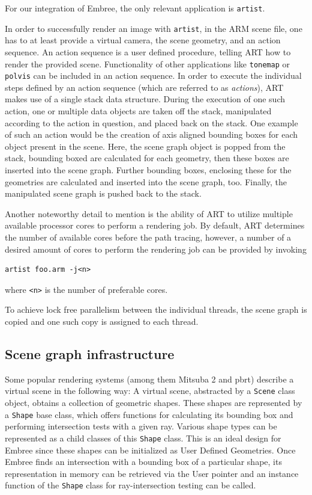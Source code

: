 For our integration of Embree, the only relevant application is \texttt{artist}. 

In order to successfully render an image with \texttt{artist}, in the ARM scene file, one has to at least provide a virtual camera, the scene geometry, and an action sequence. An action sequence is a user defined procedure, telling ART how to render the provided scene. Functionality of other applications like \texttt{tonemap} or \texttt{polvis} can be included in an action sequence.
In order to execute the individual steps  defined by an action sequence (which are referred to as \emph{actions}), ART makes use of a single stack data structure. During the execution of one such action, one or multiple data objects are taken off the stack, manipulated according to the action in question, and placed back on the stack. One example of such an action would be the creation of axis aligned bounding boxes for each object present in the scene. Here, the scene graph object is popped from the stack, bounding boxed are calculated for each geometry, then these boxes are inserted into the scene graph. Further bounding boxes, enclosing these for the geometries are calculated and inserted into the scene graph, too. Finally, the manipulated scene graph is pushed back to the stack.

Another noteworthy detail to mention is the ability of ART to utilize multiple available processor cores to perform a rendering job. By default, ART determines the number of available cores before the path tracing, however, a number of a desired amount of cores to perform the rendering job can be provided by invoking

\begin{Verbatim}
artist foo.arm -j<n>
\end{Verbatim}

where \texttt{<n>} is the number of preferable cores.

To achieve lock free parallelism between the individual threads, the scene graph is copied and one such copy is assigned to each thread. 
 

\subsection{Scene graph infrastructure}
Some popular rendering systems (among them Mitsuba 2 and pbrt) describe a virtual scene in the following way: A virtual scene, abstracted by a \texttt{Scene} class object, obtains a collection of geometric shapes. These shapes are represented by a \texttt{Shape} base class, which offers functions for calculating its bounding box and performing intersection tests with a given ray. Various shape types can be represented as a child classes of this \texttt{Shape} class. This is an ideal design for Embree since these shapes can be initialized as User Defined Geometries. Once Embree finds an intersection with a bounding box of a particular shape, its representation in memory can be retrieved via the User pointer  and an instance function of the \texttt{Shape} class for ray-intersection testing can be called. 

